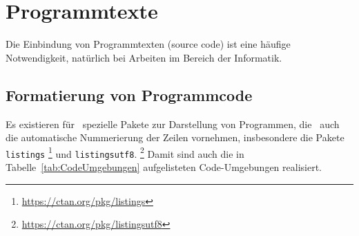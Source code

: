 \section{Programmtexte}
\label{sec:programmtexte}

Die Einbindung von Programmtexten (source code) ist eine häufige Notwendigkeit,
\va natürlich bei Arbeiten im Bereich der Informatik.


\subsection{Formatierung von Programmcode}
\label{sec:FormatierungVonProgrammcode}

Es existieren für \latex\ spezielle Pakete zur Darstellung von Programmen,
die \ua\ auch die automatische Nummerierung der Zeilen vornehmen,
insbesondere die Pakete \texttt{listings}%
\footnote{\url{https://ctan.org/pkg/listings}}
und \texttt{listingsutf8}.%
\footnote{\url{https://ctan.org/pkg/listingsutf8}}
Damit sind auch die in Tabelle~\ref{tab:CodeUmgebungen} aufgelisteten
Code-Umgebungen realisiert.
%

